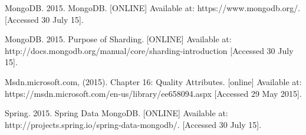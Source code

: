 \begin{flushleft}

\begin{thebibliography}{99}
	 MongoDB. 2015. MongoDB. [ONLINE] Available at: https://www.mongodb.org/. [Accessed 30 July 15].
	
	 MongoDB. 2015. Purpose of Sharding. [ONLINE] Available at: http://docs.mongodb.org/manual/core/sharding-introduction [Accessed 30 July 15].
	
	 Msdn.microsoft.com, (2015). Chapter 16: Quality Attributes. [online]  Available at: https://msdn.microsoft.com/en-us/library/ee658094.aspx [Accessed 29 May 2015].
	
	 Spring. 2015. Spring Data MongoDB. [ONLINE] Available at: http://projects.spring.io/spring-data-mongodb/. [Accessed 30 July 15].
	
\end{thebibliography}
\end{flushleft}